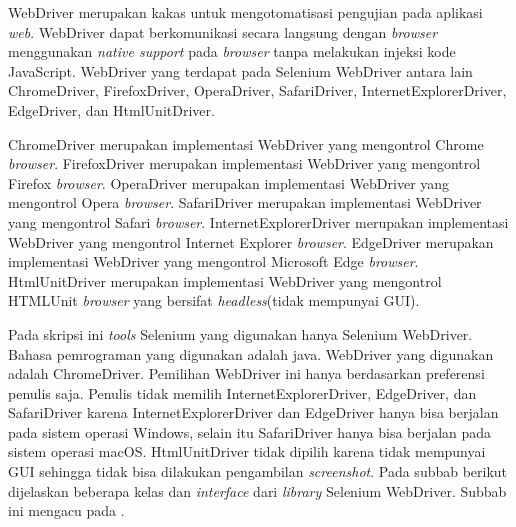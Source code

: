 WebDriver merupakan kakas untuk mengotomatisasi pengujian pada aplikasi \textit{web}\cite{Selenium_doc}. WebDriver dapat berkomunikasi secara langsung dengan \textit{browser} menggunakan \textit{native support} pada \textit{browser} tanpa melakukan injeksi kode JavaScript. WebDriver yang terdapat pada Selenium WebDriver antara lain ChromeDriver, FirefoxDriver, OperaDriver, SafariDriver, InternetExplorerDriver, EdgeDriver, dan HtmlUnitDriver.

ChromeDriver merupakan implementasi WebDriver yang mengontrol Chrome \textit{browser}. FirefoxDriver merupakan implementasi WebDriver yang mengontrol Firefox \textit{browser}. OperaDriver merupakan implementasi WebDriver yang mengontrol Opera \textit{browser}. SafariDriver merupakan implementasi WebDriver yang mengontrol Safari \textit{browser}. InternetExplorerDriver merupakan implementasi WebDriver yang mengontrol Internet Explorer \textit{browser}. EdgeDriver merupakan implementasi WebDriver yang mengontrol Microsoft Edge \textit{browser}. HtmlUnitDriver merupakan implementasi WebDriver yang mengontrol HTMLUnit \textit{browser} yang bersifat \textit{headless}(tidak mempunyai GUI). 

Pada skripsi ini \textit{tools} Selenium yang digunakan hanya Selenium WebDriver. Bahasa pemrograman yang digunakan adalah java. WebDriver yang digunakan adalah ChromeDriver. Pemilihan WebDriver ini hanya berdasarkan preferensi penulis saja. Penulis tidak memilih InternetExplorerDriver, EdgeDriver, dan SafariDriver karena InternetExplorerDriver dan EdgeDriver hanya bisa berjalan pada sistem operasi Windows, selain itu SafariDriver hanya bisa berjalan pada sistem operasi macOS. HtmlUnitDriver tidak dipilih karena tidak mempunyai GUI sehingga tidak bisa dilakukan pengambilan \textit{screenshot}. Pada subbab berikut dijelaskan beberapa kelas dan \textit{interface} dari \textit{library} Selenium WebDriver. Subbab ini mengacu pada \cite{Selenium_java_doc}.

